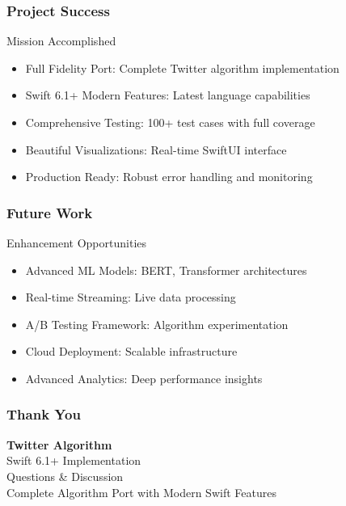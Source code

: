 \documentclass[aspectratio=169]{beamer}
\begin{document}
\begin{frame}
    \frametitle{Project Success}
    \begin{block}{Mission Accomplished}
        \begin{itemize}
            \item Full Fidelity Port: Complete Twitter algorithm implementation
            \item Swift 6.1+ Modern Features: Latest language capabilities
            \item Comprehensive Testing: 100+ test cases with full coverage
            \item Beautiful Visualizations: Real-time SwiftUI interface
            \item Production Ready: Robust error handling and monitoring
        \end{itemize}
    \end{block}
\end{frame}

\begin{frame}
    \frametitle{Future Work}
    \begin{block}{Enhancement Opportunities}
        \begin{itemize}
            \item Advanced ML Models: BERT, Transformer architectures
            \item Real-time Streaming: Live data processing
            \item A/B Testing Framework: Algorithm experimentation
            \item Cloud Deployment: Scalable infrastructure
            \item Advanced Analytics: Deep performance insights
        \end{itemize}
    \end{block}
\end{frame}

\begin{frame}
    \frametitle{Thank You}
    \begin{center}
        {\Large\color{twitterblue}\textbf{Twitter Algorithm}}\\[0.5cm]
        {\large\color{swiftorange}Swift 6.1+ Implementation}\\[1cm]
        {\large Questions \& Discussion}\\[0.5cm]
        {\large Complete Algorithm Port with Modern Swift Features}
    \end{center}
\end{frame}
\end{document}
